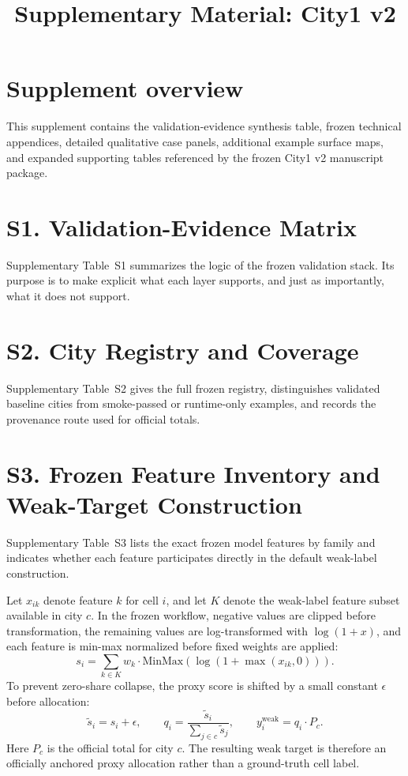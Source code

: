 \documentclass[11pt]{article}
\title{Supplementary Material: City1 v2}
\author{}
\date{}
\begin{document}
\maketitle

\section*{Supplement overview}

This supplement contains the validation-evidence synthesis table, frozen technical appendices, detailed qualitative case panels, additional example surface maps, and expanded supporting tables referenced by the frozen City1 v2 manuscript package.

\section{S1. Validation-Evidence Matrix}

Supplementary Table~S1 summarizes the logic of the frozen validation stack. Its purpose is to make explicit what each layer supports, and just as importantly, what it does not support.



\section{S2. City Registry and Coverage}

Supplementary Table~S2 gives the full frozen registry, distinguishes validated baseline cities from smoke-passed or runtime-only examples, and records the provenance route used for official totals.



\section{S3. Frozen Feature Inventory and Weak-Target Construction}

Supplementary Table~S3 lists the exact frozen model features by family and indicates whether each feature participates directly in the default weak-label construction.



Let $x_{ik}$ denote feature $k$ for cell $i$, and let $K$ denote the weak-label feature subset available in city $c$. In the frozen workflow, negative values are clipped before transformation, the remaining values are log-transformed with $\log(1+x)$, and each feature is min-max normalized before fixed weights are applied:
\[
s_i = \sum_{k \in K} w_k \cdot \mathrm{MinMax}\!\left(\log\!\left(1 + \max(x_{ik}, 0)\right)\right).
\]
To prevent zero-share collapse, the proxy score is shifted by a small constant $\epsilon$ before allocation:
\[
\tilde{s}_i = s_i + \epsilon,
\qquad
q_i = \frac{\tilde{s}_i}{\sum_{j \in c} \tilde{s}_j},
\qquad
y_i^{\mathrm{weak}} = q_i \cdot P_c.
\]
Here $P_c$ is the official total for city $c$. The resulting weak target is therefore an officially anchored proxy allocation rather than a ground-truth cell label.
\end{document}
